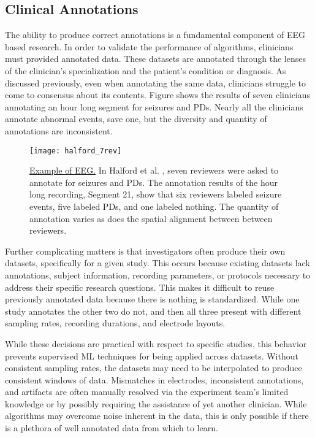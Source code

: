\subsection{Clinical Annotations}

The ability to produce correct annotations is a fundamental component of \ac{EEG} based research. In order to validate the performance of algorithms, clinicians must provided annotated data. These datasets are annotated through the lenses of the clinician's specialization and the patient's condition or diagnosis. As discussed previously, even when annotating the same data, clinicians struggle to come to consensus about its contents. Figure  shows the results of seven clinicians annotating an hour long segment for seizures and \acp{PD}. Nearly all the clinicians annotate abnormal events, save one, but the diversity and quantity of annotations are inconsistent.

\begin{figure}
\centering
\texttt{[image: halford\_7rev]}
\caption[Example of EEG]{\underline{Example of EEG.} In Halford et al. \cite{Halford2015}, seven reviewers were asked to annotate for seizures and \acp{PD}. The annotation results of the hour long recording, Segment 21, show that six reviewers labeled seizure events, five labeled \acp{PD}, and one labeled nothing. The quantity of annotation varies as does the spatial alignment between between reviewers.}
\label{fig:halford_anno}
\end{figure}

Further complicating matters is that investigators often produce their own datasets, specifically for a given study. This occurs because existing datasets lack annotations, subject information, recording parameters, or protocols necessary to address their specific research questions. This makes it difficult to reuse previously annotated data because there is nothing is standardized. While one study annotates the other two do not, and then all three present with different sampling rates, recording durations, and electrode layouts.

While these decisions are practical with respect to specific studies, this behavior prevents supervised \ac{ML} techniques for being applied across datasets. Without consistent sampling rates, the datasets may need to be interpolated to produce consistent windows of data. Mismatches in electrodes, inconsistent annotations, and artifacts are often manually resolved via the experiment team's limited knowledge or by possibly requiring the assistance of yet another clinician. While algorithms may overcome noise inherent in the data, this is only possible if there is a plethora of well annotated data from which to learn.

